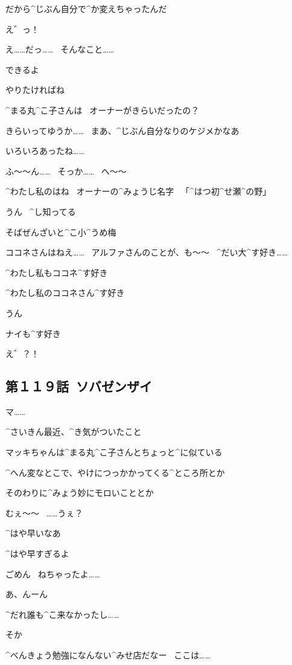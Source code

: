 \R だから^{じぶん}{自分}で^{か}{変}えちゃったんだ

\A え゛っ！

\A え……だっ……
\ そんなこと……

\R できるよ

\R やりたければね

\page
\A ^{まる}{丸}^{こ}{子}さんは
\ オーナーがきらいだったの？

\R きらいってゆうか……
\ まあ、^{じぶん}{自分}なりのケジメかなあ

\R いろいろあったね……

\A ふ〜〜ん……
\ そっか……
\ へ〜〜

\A ^{わたし}{私}のはね
\ オーナーの^{みょうじ}{名字}
\ 「^{はつ}{初}^{せ}{瀬}^{の}{野}」

\R うん
\ ^{し}{知}ってる

\page
\Sign そばぜんざいと^{こ}{小}^{うめ}{梅}

\R ココネさんはねえ……
\ アルファさんのことが、も〜〜
\ ^{だい}{大}^{す}{好}き……

\A ^{わたし}{私}もココネ^{す}{好}き

\page
\R ^{わたし}{私}のココネさん^{す}{好}き

\A うん

\page
\R ナイも^{す}{好}き

\A え゛？！


\subsection{第１１９話\ ソバゼンザイ}

\page[119]
\A マ……

\page[121]
\A ^{さいきん}{最近}、^{き}{気}がついたこと

\page
\A マッキちゃんは^{まる}{丸}^{こ}{子}さんとちょっと^{に}{似}ている

\A ^{へん}{変}なとこで、やけにつっかかってくる^{ところ}{所}とか

\A そのわりに^{みょう}{妙}にモロいこととか

\page
\M むぇ〜〜
\ ……うぇ？

\page[128]
\A ^{はや}{早}いなあ

\page
\A ^{はや}{早}すぎるよ

\page
\M ごめん
\ ねちゃったよ……

\A あ、んーん

\A ^{だれ}{誰}も^{こ}{来}なかったし……

\page
\M そか

\M ^{べんきょう}{勉強}になんない^{みせ}{店}だなー
\ ここは……

